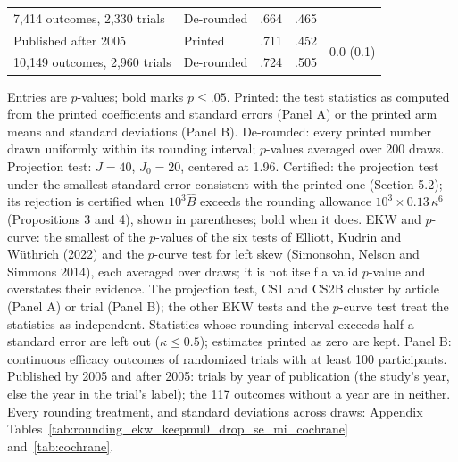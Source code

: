 \begin{table}[!htbp]
\begin{threeparttable}
\begin{tabular}{llccc}
{\footnotesize  7,414 outcomes, 2,330 trials} & De-rounded & .664 & .465 & \\
\addlinespace[2pt]
Published after 2005 & Printed & .711 & .452 & \multirow{2}{*}{0.0 (0.1)} \\
{\footnotesize 10,149 outcomes, 2,960 trials} & De-rounded & .724 & .505 & \\
\bottomrule
\end{tabular}
\begin{tablenotes}[flushleft]\footnotesize
\item Entries are $p$-values; bold marks $p \le .05$. Printed: the test statistics as computed from the printed coefficients and standard errors (Panel A) or the printed arm means and standard deviations (Panel B). De-rounded: every printed number drawn uniformly within its rounding interval; $p$-values averaged over 200 draws. Projection test: $J = 40$, $J_0 = 20$, centered at 1.96. Certified: the projection test under the smallest standard error consistent with the printed one (Section 5.2); its rejection is certified when $10^3 \hat B$ exceeds the rounding allowance $10^3 \times 0.13\,\overline{\kappa^6}$ (Propositions 3 and 4), shown in parentheses; bold when it does. EKW and $p$-curve: the smallest of the $p$-values of the six tests of Elliott, Kudrin and W\"uthrich (2022) and the $p$-curve test for left skew (Simonsohn, Nelson and Simmons 2014), each averaged over draws; it is not itself a valid $p$-value and overstates their evidence. The projection test, CS1 and CS2B cluster by article (Panel A) or trial (Panel B); the other EKW tests and the $p$-curve test treat the statistics as independent. Statistics whose rounding interval exceeds half a standard error are left out ($\kappa \le 0.5$); estimates printed as zero are kept. Panel B: continuous efficacy outcomes of randomized trials with at least 100 participants. Published by 2005 and after 2005: trials by year of publication (the study's year, else the year in the trial's label); the 117 outcomes without a year are in neither. Every rounding treatment, and standard deviations across draws: Appendix Tables~\ref{tab:rounding_ekw_keepmu0_drop_se_mi_cochrane} and~\ref{tab:cochrane}.
\end{tablenotes}
\end{threeparttable}
\end{table}
